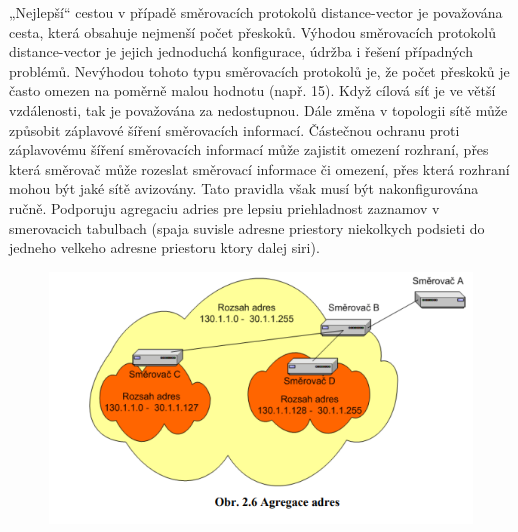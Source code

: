 „Nejlepší“ cestou v případě směrovacích protokolů distance-vector je považována cesta, 
která obsahuje nejmenší počet přeskoků. Výhodou směrovacích protokolů distance-vector je 
jejich jednoduchá konfigurace, údržba i řešení případných problémů.
Nevýhodou tohoto typu směrovacích protokolů je, že počet přeskoků je často omezen 
na poměrně malou hodnotu (např. 15). Když cílová síť je ve větší vzdálenosti, tak je 
považována za nedostupnou. Dále změna v topologii sítě může způsobit záplavové šíření 
směrovacích informací. Částečnou ochranu proti záplavovému šíření směrovacích informací 
může zajistit omezení rozhraní, přes která směrovač může rozeslat směrovací informace či 
omezení, přes která rozhraní mohou být jaké sítě avizovány. Tato pravidla však musí být 
nakonfigurována ručně. Podporuju agregaciu adries pre lepsiu priehladnost zaznamov v smerovacich tabulbach (spaja suvisle adresne priestory niekolkych podsieti do jedneho velkeho adresne priestoru ktory dalej siri).
\begin{figure}[!h]
  \begin{center}
    \includegraphics[scale=1]{BPC-HWS/images/agregacia.png}
  \end{center}
\end{figure}
